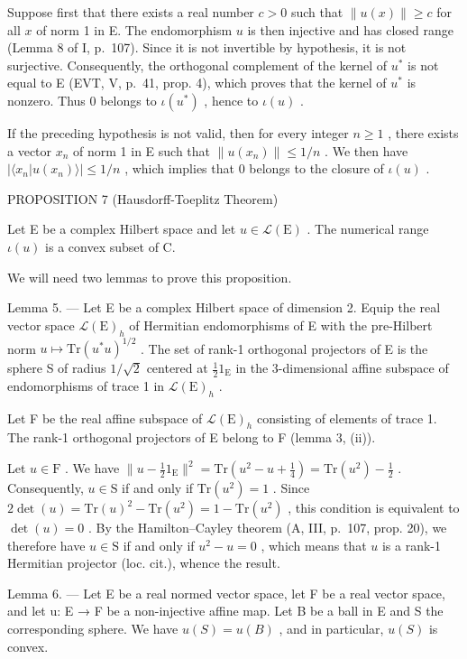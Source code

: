 Suppose first that there exists a real number \(c > 0\) such that \(\| u(x)\| \geqslant c\) for all \(x\) of norm 1 in E. The endomorphism \(u\) is then injective and has closed range (Lemma 8 of I, p.~107). Since it is not invertible by hypothesis, it is not surjective. Consequently, the orthogonal complement of the kernel of \(u^{*}\) is not equal to E (EVT, V, p.~41, prop. 4), which proves that the kernel of \(u^{*}\) is nonzero. Thus 0 belongs to \(\iota(u^{*})\) , hence to \(\iota(u)\) .

If the preceding hypothesis is not valid, then for every integer \(n \geqslant 1\) , there exists a vector \(x_{n}\) of norm 1 in E such that \(\|u(x_{n})\| \leqslant 1/n\) . We then have \(|\langle x_{n}|u(x_{n})\rangle| \leqslant 1/n\) , which implies that 0 belongs to the closure of \(\iota(u)\) .

PROPOSITION 7 (Hausdorff-Toeplitz Theorem)

Let E be a complex Hilbert space and let \(u \in \mathcal{L}(\mathrm{E})\) . The numerical range \(\iota(u)\) is a convex subset of C.

We will need two lemmas to prove this proposition.

Lemma 5. --- Let E be a complex Hilbert space of dimension 2. Equip the real vector space \(\mathcal{L}(\mathrm{E})_h\) of Hermitian endomorphisms of E with the pre-Hilbert norm \(u \mapsto \mathrm{Tr}(u^* u)^{1/2}\) . The set of rank-1 orthogonal projectors of E is the sphere S of radius \(1/\sqrt{2}\) centered at \(\frac{1}{2} 1_{\mathrm{E}}\) in the 3-dimensional affine subspace of endomorphisms of trace 1 in \(\mathcal{L}(\mathrm{E})_h\) .

Let F be the real affine subspace of \(\mathcal{L}(\mathrm{E})_h\) consisting of elements of trace 1. The rank-1 orthogonal projectors of E belong to F (lemma 3, (ii)).

Let \(u \in \mathrm{F}\) . We have \(\| u - \frac{1}{2} 1_{\mathrm{E}} \|^{2} = \mathrm{Tr}(u^{2} - u + \frac{1}{4}) = \mathrm{Tr}(u^{2}) - \frac{1}{2}\) . Consequently, \(u \in \mathrm{S}\) if and only if \(\mathrm{Tr}(u^{2}) = 1\) . Since \(2\det(u) = \mathrm{Tr}(u)^{2} - \mathrm{Tr}(u^{2}) = 1 - \mathrm{Tr}(u^{2})\) , this condition is equivalent to \(\det(u) = 0\) . By the Hamilton--Cayley theorem (A, III, p.~107, prop. 20), we therefore have \(u \in \mathrm{S}\) if and only if \(u^{2} - u = 0\) , which means that \(u\) is a rank-1 Hermitian projector (loc. cit.), whence the result.

Lemma 6. --- Let E be a real normed vector space, let F be a real vector space, and let u: E → F be a non-injective affine map. Let B be a ball in E and S the corresponding sphere. We have \(u(S) = u(B)\) , and in particular, \(u(S)\) is convex.

